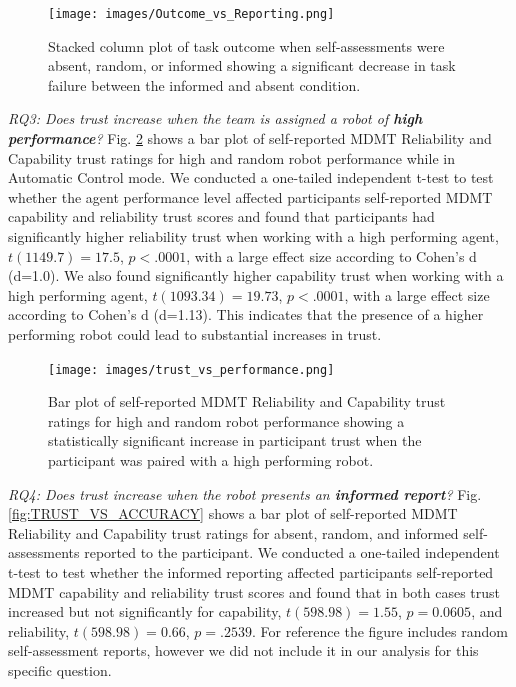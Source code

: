 \documentclass[aaai]{article}
\begin{document}
\begin{figure}[htbp]
\centering
\texttt{[image: images/Outcome\_vs\_Reporting.png]}
\caption{Stacked column plot of task outcome when self-assessments were absent, random, or informed showing a significant decrease in task failure between the informed and absent condition.}
\label{fig:OUTCOME_VS_ACCURATE}
\end{figure}

\emph{RQ3: Does trust increase when the team is assigned a robot of \textbf{high performance}?} Fig. \ref{fig:TRUST_VS_PERFORMANCE} shows a bar plot of self-reported MDMT Reliability and Capability trust ratings for high and random robot performance while in Automatic Control mode. We conducted a one-tailed independent t-test to test whether the agent performance level affected participants self-reported MDMT capability and reliability trust scores and found that participants had significantly higher reliability trust when working with a high performing agent, $t(1149.7)=17.5$, $p<.0001$, with a large effect size according to Cohen's d (d=1.0). We also found significantly higher capability trust when working with a high performing agent, $t(1093.34)=19.73$, $p<.0001$, with a large effect size according to Cohen's d (d=1.13). This indicates that the presence of a higher performing robot could lead to substantial increases in trust.

\begin{figure}[htbp]
\centering
\texttt{[image: images/trust\_vs\_performance.png]}
\caption{Bar plot of self-reported MDMT Reliability and Capability trust ratings for high and random robot performance showing a statistically significant increase in participant trust when the participant was paired with a high performing robot.}
\label{fig:TRUST_VS_PERFORMANCE}
\end{figure}

\emph{RQ4: Does trust increase when the robot presents an \textbf{informed report}?} Fig. \ref{fig:TRUST_VS_ACCURACY} shows a bar plot of self-reported MDMT Reliability and Capability trust ratings for absent, random, and informed self-assessments reported to the participant. We conducted a one-tailed independent t-test to test whether the informed reporting affected participants self-reported MDMT capability and reliability trust scores and found that in both cases trust increased but not significantly for capability, $t(598.98)=1.55$, $p=0.0605$, and reliability, $t(598.98)=0.66$, $p=.2539$. For reference the figure includes random self-assessment reports, however we did not include it in our analysis for this specific question.
\end{document}

